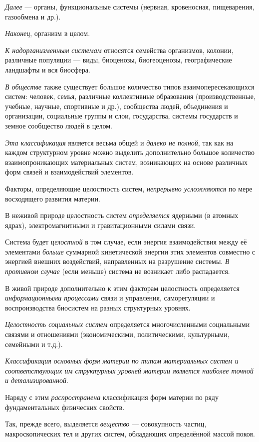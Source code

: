 \documentclass[a4paper,14pt,russian]{extreport}
\begin{document}
\emph{Далее} --- органы, функциональные системы (нервная, кровеносная, пищеварения, газообмена и др.).

\emph{Наконец}, организм в целом.

\emph{К надорганизменным системам} относятся семейства организмов, колонии, различные популяции --- виды, биоценозы, биогеоценозы, географические ландшафты и вся биосфера.

\emph{В обществе} также существует большое количество типов взаимопересекающихся систем: человек, семья, различные коллективные образования (производственные, учебные, научные, спортивные и др.), сообщества людей, объединения и организации, социальные группы и слои, государства, системы государств и земное сообщество людей в целом.

\emph{Эта классификация} является весьма общей и \emph{далеко не полной}, так как на каждом структурном уровне можно выделить дополнительно большое количество взаимопроникающих материальных систем, возникающих на основе различных форм связей и взаимодействий элементов.

Факторы, определяющие целостность систем, \emph{непрерывно усложняются} по мере восходящего развития материи.

В неживой природе целостность систем \emph{определяется} ядерными (в атомных ядрах), электромагнитными и гравитационными силами связи.

Система будет \emph{целостной} в том случае, если энергия взаимодействия между её элементами \emph{больше} суммарной кинетической энергии этих элементов совместно с энергией внешних воздействий, направленных на разрушение системы. \emph{В противном случае} (если меньше) система не возникает либо распадается.

В живой природе дополнительно к этим факторам целостность определяется \emph{информационными процессами} связи и управления, саморегуляции и воспроизводства биосистем на разных структурных уровнях.

\emph{Целостность социальных систем} определяется многочисленными социальными связями и отношениями (экономическими, политическими, культурными, семейными и т.д.).

\emph{Классификация основных форм материи по типам материальных систем и соответствующих им структурных уровней материи является наиболее точной и детализированной}.

Наряду с этим \emph{распространена} классификация форм материи по ряду фундаментальных физических свойств.

Так, прежде всего, выделяется \emph{вещество} --- совокупность частиц, макроскопических тел и других систем, обладающих определённой массой покоя.
\end{document}
